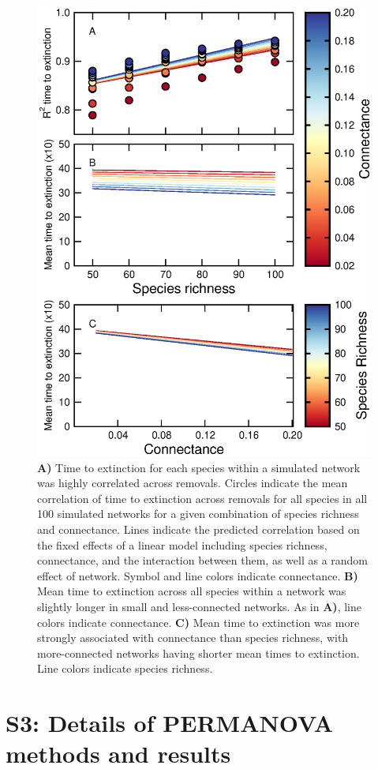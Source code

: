 \documentclass[12pt]{article}
\begin{document}
\begin{spacing}{2.0}
		\begin{figure}[hb!]
			\caption{\textbf{A)} Time to extinction for each species within a simulated network was highly correlated across removals. Circles indicate the mean correlation of time to extinction across removals for all species in all 100 simulated networks for a given combination of species richness and connectance. Lines indicate the predicted correlation based on the fixed effects of a linear model including species richness, connectance, and the interaction between them, as well as a random effect of network. Symbol and line colors indicate connectance. \textbf{B)} Mean time to extinction across all species within a network was slightly longer in small and less-connected networks. As in \textbf{A)}, line colors indicate connectance. \textbf{C)} Mean time to extinction was more strongly associated with connectance than species richness, with more-connected networks having shorter mean times to extinction. Line colors indicate species richness.}
			\label{extorder_corrs}
			\includegraphics[width=.75\textwidth]{figures/extinction_order/extorder_correlations.eps}
			\end{figure}		

\clearpage


\section*{S3: Details of PERMANOVA methods and results}


\end{spacing}
\end{document}
